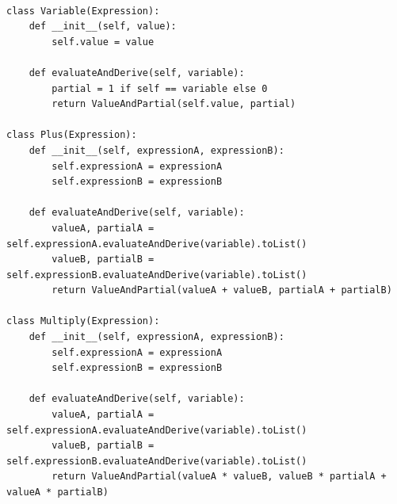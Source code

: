 \documentclass[zavrsnirad]{fer}
\begin{document}
\\
\begin{lstlisting}[caption={Primjer implementacije unaprijedne metode u programskom jeziku \textit{Python} \cite{wiki:autodiff}}]
class Variable(Expression):
    def __init__(self, value):
        self.value = value

    def evaluateAndDerive(self, variable):
        partial = 1 if self == variable else 0
        return ValueAndPartial(self.value, partial)

class Plus(Expression):
    def __init__(self, expressionA, expressionB):
        self.expressionA = expressionA
        self.expressionB = expressionB

    def evaluateAndDerive(self, variable):
        valueA, partialA = self.expressionA.evaluateAndDerive(variable).toList()
        valueB, partialB = self.expressionB.evaluateAndDerive(variable).toList()
        return ValueAndPartial(valueA + valueB, partialA + partialB)

class Multiply(Expression):
    def __init__(self, expressionA, expressionB):
        self.expressionA = expressionA
        self.expressionB = expressionB

    def evaluateAndDerive(self, variable):
        valueA, partialA = self.expressionA.evaluateAndDerive(variable).toList()
        valueB, partialB = self.expressionB.evaluateAndDerive(variable).toList()
        return ValueAndPartial(valueA * valueB, valueB * partialA + valueA * partialB)
\end{lstlisting}
\end{document}
